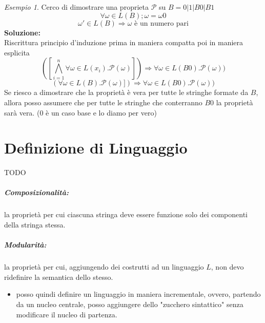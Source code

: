 \documentclass[a4paper]{report}
\newcommand{\prop}{\mathcal{P}}
\theoremstyle{definition} \newtheorem*{defi}{Def}
\theoremstyle{plain} \newtheorem{lemma}{Lemma}
\theoremstyle{plain} \newtheorem{teo}{Teorema}
\theoremstyle{remark} \newtheorem*{es}{Esempio}
\begin{document}
\begin{es}
  Cerco di dimostrare una proprieta $\prop$ su $B=0|1|B0|B1$ \\
  \[
    \forall \omega \in L(B);\omega=\omega0
  \]
  \[
    \omega' \in L(B) \Rightarrow \text{$\omega$ è un numero pari}
  \]
  \textbf{Soluzione:} \\
  Riscrittura principio d'induzione prima in maniera compatta poi in maniera esplicita
   \[
    ([\bigwedge_{i=1}^{n} \forall \omega \in L(x_i).\prop(\omega)])
    \Rightarrow \forall \omega \in L(B0).\prop(\omega))
  \]
  \[
    (\forall \omega \in L(B).\prop(\omega)])
    \Rightarrow \forall \omega \in L(B0).\prop(\omega))
  \]
  Se riesco a dimostrare che la proprietà è vera per tutte le stringhe formate da $B$, allora posso assumere che per tutte le stringhe che conterranno $B0$ la proprietà sarà vera. ($0$ è un caso base e lo diamo per vero)

\end{es}

\chapter{Definizione di Linguaggio}
TODO
\paragraph{Composizionalità:}
la proprietà per cui ciascuna stringa deve essere funzione solo dei componenti della stringa stessa.
\paragraph{Modularità:}
la proprietà per cui, aggiungendo dei costrutti ad un linguaggio $L$, non devo ridefinire la semantica dello stesso.
\begin{itemize}
	\item posso quindi definire un linguaggio in maniera incrementale, ovvero, partendo da un nucleo centrale, posso aggiungere dello "zucchero sintattico" senza modificare il nucleo di partenza.
\end{itemize}
\end{document}
